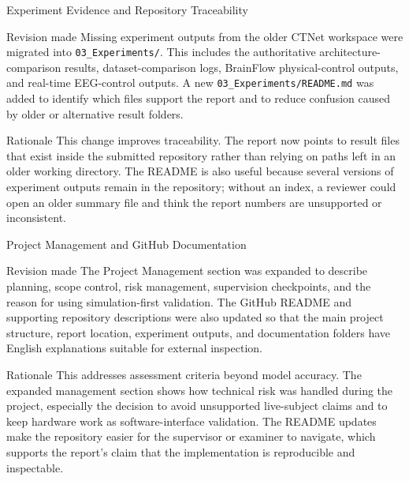 \documentclass[UTF8,aspectratio=169,11pt]{ctexbeamer}
\begin{document}
\begin{frame}[t]{Experiment Evidence and Repository Traceability}
\footnotesize

    \begin{block}{Revision made}
        Missing experiment outputs from the older CTNet workspace were migrated into \texttt{03\_Experiments/}. This includes the authoritative architecture-comparison results, dataset-comparison logs, BrainFlow physical-control outputs, and real-time EEG-control outputs. A new \texttt{03\_Experiments/README.md} was added to identify which files support the report and to reduce confusion caused by older or alternative result folders.
    \end{block}

    \vfill

    \begin{alertblock}{Rationale}
        This change improves traceability. The report now points to result files that exist inside the submitted repository rather than relying on paths left in an older working directory. The README is also useful because several versions of experiment outputs remain in the repository; without an index, a reviewer could open an older summary file and think the report numbers are unsupported or inconsistent.
    \end{alertblock}

\end{frame}

\begin{frame}[t]{Project Management and GitHub Documentation}
\footnotesize

    \begin{block}{Revision made}
        The Project Management section was expanded to describe planning, scope control, risk management, supervision checkpoints, and the reason for using simulation-first validation. The GitHub README and supporting repository descriptions were also updated so that the main project structure, report location, experiment outputs, and documentation folders have English explanations suitable for external inspection.
    \end{block}

    \vfill

    \begin{alertblock}{Rationale}
        This addresses assessment criteria beyond model accuracy. The expanded management section shows how technical risk was handled during the project, especially the decision to avoid unsupported live-subject claims and to keep hardware work as software-interface validation. The README updates make the repository easier for the supervisor or examiner to navigate, which supports the report's claim that the implementation is reproducible and inspectable.
    \end{alertblock}

\end{frame}
\end{document}
